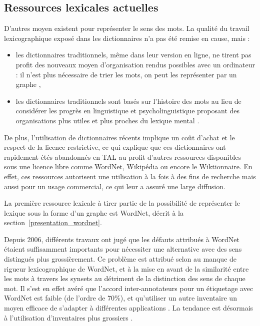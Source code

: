 \subsection{Ressources lexicales actuelles}
\label{subsec:ressources_lexicales}

D'autres moyen existent pour représenter le sens des mots. La qualité du
travail lexicographique exposé dans les dictionnaires n'a pas été remise en
cause, mais :

\begin{itemize}

    \item les dictionnaires traditionnels, même dans leur version en ligne, ne
        tirent pas profit des nouveaux moyen d'organisation rendus possibles
        avec un ordinateur : il n'est plus nécessaire de trier les mots, on
        peut les représenter par un graphe
        \citep{miller1990introduction,polguere2013tissage},

    \item les dictionnaires traditionnels sont basés sur l'histoire des mots au
        lieu de considérer les progrès en linguistique et psycholinguistique
        proposant des organisations plus utiles et plus proches du lexique
        mental \citep{miller1990introduction}.

\end{itemize}

De plus, l'utilisation de dictionnaires récents implique un coût d'achat et le
respect de la licence restrictive, ce qui explique que ces dictionnaires ont
rapidement étés abandonnés en TAL au profit d'autres ressources disponibles
sous une licence libre comme WordNet, Wikipédia ou encore le Wiktionnaire. En
effet, ces ressources autorisent une utilisation à la fois à des fins de
recherche mais aussi pour un usage commercial, ce qui leur a assuré une large
diffusion.

La première ressource lexicale à tirer partie de la possibilité de représenter
le lexique sous la forme d'un graphe est WordNet, décrit à la
section~\ref{presentation_wordnet}.

Depuis 2006, différents travaux ont jugé que les défauts attribués à WordNet
\citep{hovy2006ontonotes,boyd2006adding,ide2006making,navigli2007semeval,snow2007learning}
étaient suffisamment importants pour nécessiter une alternative avec des sens
distingués plus grossièrement. Ce problème est attribué selon
\cite{edmonds2002introduction} au manque de rigueur lexicographique de WordNet,
et à la mise en avant de la similarité entre les mots à travers les synsets au
détriment de la distinction des sens de chaque mot. Il s'est en effet avéré que
l'accord inter-annotateurs pour un étiquetage avec WordNet est faible (de
l'ordre de 70\%), et qu'utiliser un autre inventaire un moyen efficace de
s'adapter à différentes applications \citep{palmer2004different}. La tendance
est désormais à l'utilisation d'inventaires plus grossiers
\citep{navigli2007semeval,navigli2012quick}.

